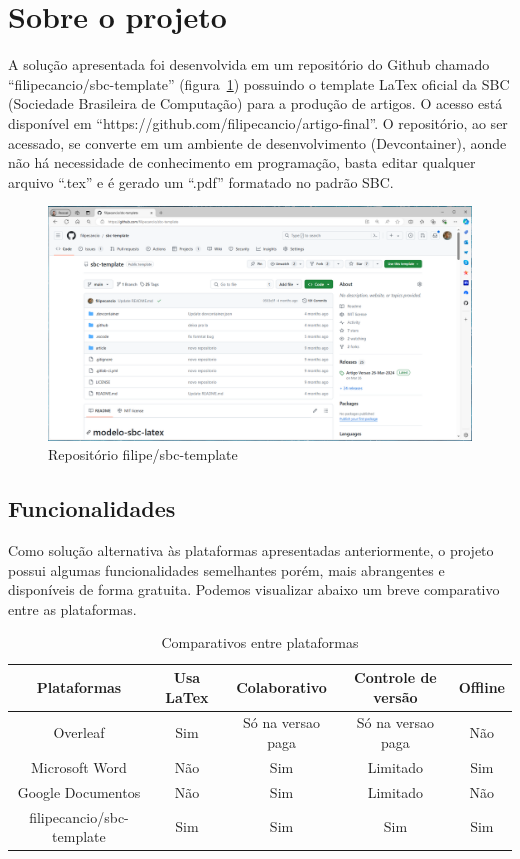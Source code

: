 \section{Sobre o projeto}

A solução apresentada foi desenvolvida em um repositório do Github chamado ``filipecancio/sbc-template'' (figura~\ref{fig:fig10}) possuindo o template LaTex oficial da SBC (Sociedade Brasileira de Computação) para a produção de artigos. O acesso está disponível em ``https://github.com/filipecancio/artigo-final''. O repositório, ao ser acessado, se converte em um ambiente de desenvolvimento (Devcontainer), aonde não há necessidade de conhecimento em programação, basta editar qualquer arquivo ``.tex'' e é gerado um ``.pdf'' formatado no padrão SBC.

\begin{figure}[ht]
	\centering
	\includegraphics[width=.7\textwidth]{./images/fig10.png}
	\caption{Repositório filipe/sbc-template}
	\label{fig:fig10}
\end{figure}

\subsection{Funcionalidades}

Como solução alternativa às plataformas apresentadas anteriormente, o projeto possui algumas funcionalidades semelhantes porém, mais abrangentes e disponíveis de forma gratuita. Podemos visualizar abaixo um breve comparativo entre as plataformas.

\begin{table}[ht]
	\centering
	\begin{tabular}{|c|c|c|c|c|}
		\hline
		Plataformas & Usa LaTex & Colaborativo & Controle de versão & Offline
		\\
		\hline
		Overleaf & Sim & Só na versao paga & Só na versao paga & Não \\
		\hline
		Microsoft Word & Não & Sim & Limitado & Sim \\
		\hline
		Google Documentos & Não & Sim & Limitado & Não \\
		\hline
		filipecancio/sbc-template & Sim & Sim & Sim & Sim \\
		\hline
	\end{tabular}
	\caption{Comparativos entre plataformas}
	\label{tab:tabela01}
\end{table}

